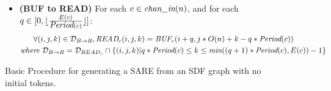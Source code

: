 \begin{figure}[t]
{\begin{minipage}{6.3in}
\begin{itemize}
\begin{align}
&\mt{where } {\cal D}_{W {\small \rightarrow} B}(c,q) = 
  {\cal D}_{{BUF}_{c}} \cap 
  \{ (i,j) | q*U(c) \le j \le (q+1)*U(c) - 1 \}
\end{align}
\item {\bf(BUF to READ)} For each $c \in \mbox{\it chan\_in}(n)$, 
       and for each $q \in [0, \lfloor \frac{E(c)}{\mbox{\it Period}(c)} \rfloor ]$:
\begin{align}
&~~~~~\forall (i,j,k) \in {\cal D}_{B {\small \rightarrow} R},
\mbox{\it READ}_{c}(i,j,k) = \mbox{\it BUF}_{c}(i+q,j*O(n) + k - q * \mbox{\it Period}(c)) \\ \nonumber
&\mbox{\it where }{\cal D}_{B {\small \rightarrow} R} = 
  {\cal D}_{READ_{c}} \cap \{ (i,j,k) | q * \mbox{\it Period}(c) \le k \le \mbox{\it min}((q+1)*\mbox{\it Period}(c), E(c)) - 1 \}
\end{align}
\end{itemize}

\end{minipage}}
\caption{Basic Procedure for generating a SARE from an SDF graph with no initial tokens.
\protect\label{fig:sdftosare}}
\end{figure}





